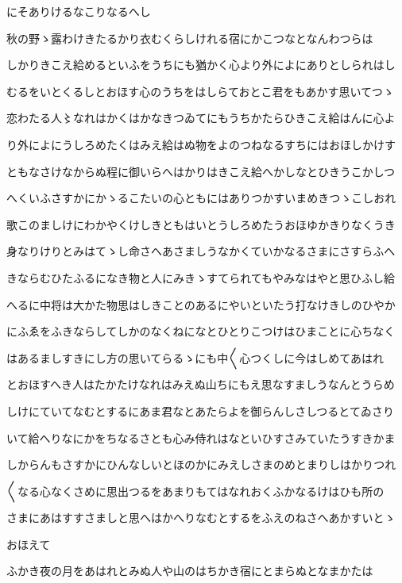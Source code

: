 \documentclass[a4paper,11pt,landscape]{ltjtarticle}
\begin{document}
にそありけるなこりなるへし
\par\medskip
秋の野ゝ露わけきたるかり衣むくらしけれる宿にかこつなとなんわつらは
\par\medskip
しかりきこえ給めるといふをうちにも猶かく心より外によにありとしられはし
\par\medskip
むるをいとくるしとおほす心のうちをはしらておとこ君をもあかす思いてつゝ
\par\medskip
恋わたる人〻なれはかくはかなきつゐてにもうちかたらひきこえ給はんに心よ
\par\medskip
り外によにうしろめたくはみえ給はぬ物をよのつねなるすちにはおほしかけす
\par\medskip
ともなさけなからぬ程に御いらへはかりはきこえ給へかしなとひきうこかしつ
\par\medskip
へくいふさすかにかゝるこたいの心ともにはありつかすいまめきつゝこしおれ
\par\medskip
歌このましけにわかやくけしきともはいとうしろめたうおほゆかきりなくうき
\par\medskip
身なりけりとみはてゝし命さへあさましうなかくていかなるさまにさすらふへ
\par\medskip
きならむひたふるになき物と人にみきゝすてられてもやみなはやと思ひふし給
\par\medskip
へるに中将は大かた物思はしきことのあるにやいといたう打なけきしのひやか
\par\medskip
にふゑをふきならしてしかのなくねになとひとりこつけはひまことに心ちなく
\par\medskip
はあるましすきにし方の思いてらるゝにも中〱心つくしに今はしめてあはれ
\par\medskip
とおほすへき人はたかたけなれはみえぬ山ちにもえ思なすましうなんとうらめ
\par\medskip
しけにていてなむとするにあま君なとあたらよを御らんしさしつるとてゐさり
\par\medskip
いて給へりなにかをちなるさとも心み侍れはなといひすさみていたうすきかま
\par\medskip
しからんもさすかにひんなしいとほのかにみえしさまのめとまりしはかりつれ
\par\medskip
〱なる心なくさめに思出つるをあまりもてはなれおくふかなるけはひも所の
\par\medskip
さまにあはすすさましと思へはかへりなむとするをふえのねさへあかすいとゝ
\par\medskip
おほえて
\par\medskip
ふかき夜の月をあはれとみぬ人や山のはちかき宿にとまらぬとなまかたは
\par\medskip
\end{document}
